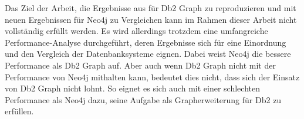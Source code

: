 Das Ziel der Arbeit, die Ergebnisse aus \cite{sigmod_tian} für Db2 Graph zu reproduzieren und mit neuen Ergebnissen für Neo4j zu Vergleichen kann im Rahmen dieser Arbeit nicht vollständig erfüllt werden. Es wird allerdings trotzdem eine umfangreiche Performance-Analyse durchgeführt, deren Ergebnisse sich für eine Einordnung und den Vergleich der Datenbanksysteme eignen. Dabei weist Neo4j die bessere Performance als Db2 Graph auf. Aber auch wenn Db2 Graph nicht mit der Performance von Neo4j mithalten kann, bedeutet dies nicht, dass sich der Einsatz von Db2 Graph nicht lohnt. So eignet es sich auch mit einer schlechten Performance als Neo4j dazu, seine Aufgabe als Grapherweiterung für Db2 zu erfüllen.